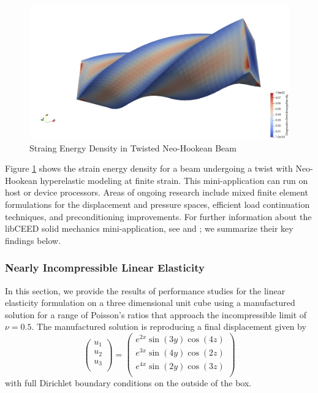 \begin{figure}[ht!]
\includegraphics[width=.99\linewidth]{../img/SolidTwistExample}
\caption{Straing Energy Density in Twisted Neo-Hookean Beam}
\label{fig:solidtwist}
\end{figure}

Figure \ref{fig:solidtwist} shows the strain energy density for a beam undergoing a twist with Neo-Hookean hyperelastic modeling at finite strain.
This mini-application can run on host or device processors.
Areas of ongoing research include mixed finite element formulations for the displacement and pressure spaces, efficient load continuation techniques, and preconditioning improvements.
For further information about the libCEED solid mechanics mini-application, see \cite{imece2020} and \cite{mehraban2021simulating}; we summarize their key findings below.

\subsubsection{Nearly Incompressible Linear Elasticity}

In this section, we provide the results of performance studies for the linear elasticity formulation on a three dimensional unit cube using a manufactured solution for a range of Poisson's ratios that approach the incompressible limit of $\nu = 0.5$.
The manufactured solution is reproducing a final displacement given by
\begin{equation}
\begin{pmatrix}
u_1 \\
u_2 \\
u_3 \\
\end{pmatrix} =
\begin{pmatrix}
e^{2 x} \sin \left( 3 y \right) \cos \left( 4 z \right) \\
e^{3 x} \sin \left( 4 y \right) \cos \left( 2 z \right) \\
e^{4 x} \sin \left( 2 y \right) \cos \left( 3 z \right) \\
\end{pmatrix}
\end{equation}
with full Dirichlet boundary conditions on the outside of the box.

